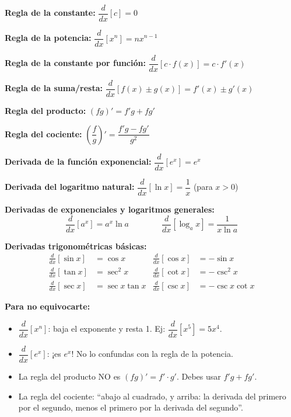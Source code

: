 \documentclass[12pt, letterpaper]{article}
\begin{document}
\begin{cuadroteoria}
  \textbf{Regla de la constante:} $\dfrac{d}{dx}[c] = 0$

  \textbf{Regla de la potencia:} $\dfrac{d}{dx}[x^n] = n x^{n-1}$

  \textbf{Regla de la constante por función:} $\dfrac{d}{dx}[c \cdot f(x)] = c \cdot f'(x)$

  \textbf{Regla de la suma/resta:} $\dfrac{d}{dx}[f(x) \pm g(x)] = f'(x) \pm g'(x)$

  \textbf{Regla del producto:} $(fg)' = f'g + fg'$

  \textbf{Regla del cociente:} $\left(\dfrac{f}{g}\right)' = \dfrac{f'g - fg'}{g^2}$

  \textbf{Derivada de la función exponencial:} $\dfrac{d}{dx}[e^x] = e^x$

  \textbf{Derivada del logaritmo natural:} $\dfrac{d}{dx}[\ln x] = \dfrac{1}{x}$ (para $x > 0$)

  \textbf{Derivadas de exponenciales y logaritmos generales:}
  $$\frac{d}{dx}[a^x] = a^x \ln a \qquad\qquad \frac{d}{dx}[\log_a x] = \frac{1}{x \ln a}$$
\end{cuadroteoria}

\begin{cuadrosolucion}
  \textbf{Derivadas trigonométricas básicas:}
  \begin{align*}
    \frac{d}{dx}[\sin x] & = \cos x        & \frac{d}{dx}[\cos x] & = -\sin x        \\
    \frac{d}{dx}[\tan x] & = \sec^2 x      & \frac{d}{dx}[\cot x] & = -\csc^2 x      \\
    \frac{d}{dx}[\sec x] & = \sec x \tan x & \frac{d}{dx}[\csc x] & = -\csc x \cot x
  \end{align*}
\end{cuadrosolucion}

\begin{cuadroadvertencia}
  \textbf{Para no equivocarte:}
  \begin{itemize}[leftmargin=*]
    \item $\dfrac{d}{dx}[x^n]$: baja el exponente y resta 1. Ej: $\dfrac{d}{dx}[x^5] = 5x^4$.
    \item $\dfrac{d}{dx}[e^x]$: ¡es $e^x$! No lo confundas con la regla de la potencia.
    \item La regla del producto NO es $(fg)' = f' \cdot g'$. Debes usar $f'g + fg'$.
    \item La regla del cociente: ``abajo al cuadrado, y arriba: la derivada del primero por el segundo, menos el primero por la derivada del segundo''.
  \end{itemize}
\end{cuadroadvertencia}
\end{document}
